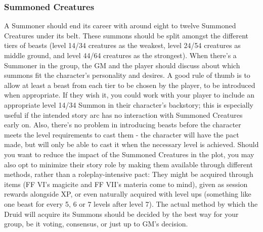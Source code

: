 \begin{multicols}{2}
\subsubsection{Summoned Creatures}\label{subsubsec:gm-summons}
A Summoner should end its career with around eight to twelve Summoned Creatures under its belt. These summons should be split amongst the different tiers of beasts (level 14/34 creatures as the weakest, level 24/54 creatures as middle ground, and level 44/64 creatures as the strongest). When there's a Summoner in the group, the GM and the player should discuss about which summons fit the character's personality and desires. A good rule of thumb is to allow at least a beast from each tier to be chosen by the player, to be introduced when appropriate. If they wish it, you could work with your player to include an appropriate level 14/34 Summon in their character's backstory; this is especially useful if the intended story arc has no interaction with Summoned Creatures early on. Also, there's no problem in introducing beasts before the character meets the level requirements to cast them - the character will have the pact made, but will only be able to cast it when the necessary level is achieved. Should you want to reduce the impact of the Summoned Creatures in the plot, you may also opt to minimize their story role by making them available through different methods, rather than a roleplay-intensive pact: They might be acquired through items (FF VI's magicite and FF VII's materia come to mind), given as session rewards alongside XP, or even naturally acquired with level ups (something like one beast for every 5, 6 or 7 levels after level 7). The actual method by which the Druid will acquire its Summons should be decided by the best way for your group, be it voting, consensus, or just up to GM's decision.

\begin{center}
\end{center}


\end{multicols}
